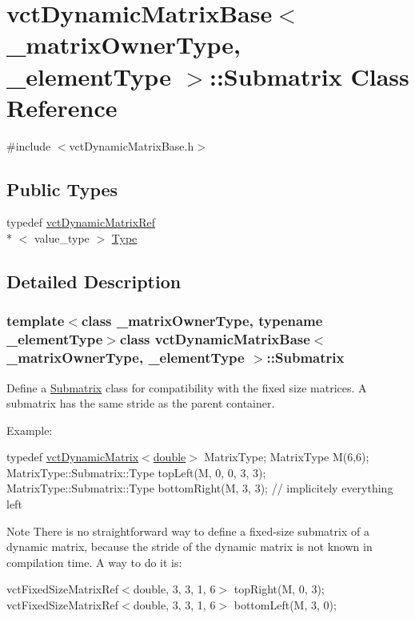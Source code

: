 \hypertarget{classvct_dynamic_matrix_base_1_1_submatrix}{\section{vct\-Dynamic\-Matrix\-Base$<$ \-\_\-matrix\-Owner\-Type, \-\_\-element\-Type $>$\-:\-:Submatrix Class Reference}
\label{classvct_dynamic_matrix_base_1_1_submatrix}
}


{\ttfamily \#include $<$vct\-Dynamic\-Matrix\-Base.\-h$>$}

\subsection*{Public Types}
\begin{DoxyCompactItemize}
\item 
typedef \hyperlink{classvct_dynamic_matrix_ref}{vct\-Dynamic\-Matrix\-Ref}\\*
$<$ value\-\_\-type $>$ \hyperlink{classvct_dynamic_matrix_base_1_1_submatrix_a253f9d0900cce7df1b7ec9e3d5117623}{Type}
\end{DoxyCompactItemize}


\subsection{Detailed Description}
\subsubsection*{template$<$class \-\_\-matrix\-Owner\-Type, typename \-\_\-element\-Type$>$class vct\-Dynamic\-Matrix\-Base$<$ \-\_\-matrix\-Owner\-Type, \-\_\-element\-Type $>$\-::\-Submatrix}

Define a \hyperlink{classvct_dynamic_matrix_base_1_1_submatrix}{Submatrix} class for compatibility with the fixed size matrices. A submatrix has the same stride as the parent container.

Example\-:

typedef \hyperlink{classvct_dynamic_matrix}{vct\-Dynamic\-Matrix$<$double$>$} Matrix\-Type; Matrix\-Type M(6,6); Matrix\-Type\-::\-Submatrix\-::\-Type top\-Left(\-M, 0, 0, 3, 3); Matrix\-Type\-::\-Submatrix\-::\-Type bottom\-Right(\-M, 3, 3); // implicitely everything left

\begin{DoxyNote}{Note}
There is no straightforward way to define a fixed-\/size submatrix of a dynamic matrix, because the stride of the dynamic matrix is not known in compilation time. A way to do it is\-:
\end{DoxyNote}
vct\-Fixed\-Size\-Matrix\-Ref$<$double, 3, 3, 1, 6$>$ top\-Right(\-M, 0, 3); vct\-Fixed\-Size\-Matrix\-Ref$<$double, 3, 3, 1, 6$>$ bottom\-Left(\-M, 3, 0); 

